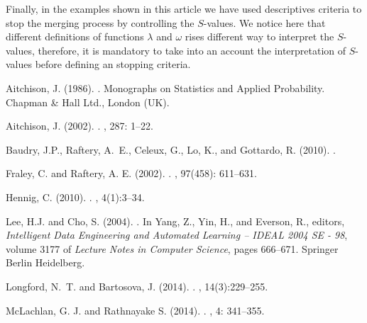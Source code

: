 \documentclass[submit]{smj}
\theoremstyle{definition}
\begin{document}
Finally, in the examples shown in this article we have used descriptives criteria to stop the merging process by controlling the $S$-values. We notice here that different definitions of functions $\lambda$ and $\omega$ rises different way to interpret the $S$-values, therefore, it is mandatory to take into an account the interpretation of $S$-values before defining an stopping criteria.

\newpage


\begin{thebibliography}{}

Aitchison, J. (1986).
.
\newblock Monographs on Statistics and Applied Probability. Chapman \& Hall
  Ltd., London (UK).

Aitchison, J. (2002).
.
, 287: 1--22.

Baudry, J.P., Raftery, A.~E., Celeux, G., Lo, K., and Gottardo, R. (2010).
.

Fraley, C. and Raftery, A. E. (2002).
.
, 97(458): 611–631.

Hennig, C. (2010).
.
, 4(1):3--34.

Lee, H.J. and Cho, S. (2004).
.
\newblock In Yang, Z., Yin, H., and Everson, R., editors, {\em Intelligent Data
  Engineering and Automated Learning – IDEAL 2004 SE - 98}, volume 3177 of
  {\em Lecture Notes in Computer Science}, pages 666--671. Springer Berlin
  Heidelberg.

Longford, N.~T. and Bartosova, J. (2014).
.
, 14(3):229--255.


McLachlan, G. J. and Rathnayake S. (2014).
.
,  4: 341–355.


\end{thebibliography}
\end{document}
